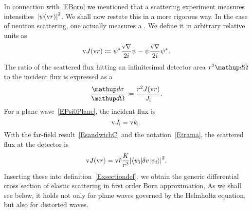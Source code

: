 In connection with \cref{EBorn} we mentioned
that a scattering experiment measures intensities~${|\psi(\text{v}{r})|}^2$.
We shall now restate this in a more rigorous way.
In the case of neutron scattering,
one actually measures a .
We define it in arbitrary relative units as
\begin{equation}\label{EdefJ}
  \text{v}{J}(\text{v}{r}) \coloneqq  \psi^*\frac{\text{v}{\nabla}}{2i}\psi - \psi\frac{\text{v}{\nabla}}{2i}\psi^*.
\end{equation}
%
%
The ratio of the scattered flux hitting an infinitesimal detector area
$r^2\d\Omega$ to the incident flux is expressed as a
%
%
\begin{equation}\label{Exsectiondef}
  \xElas
  \coloneqq  \frac{r^2 J(\r)}{J_\si}.
\end{equation}
%
%
For a plane wave~\cref{EPsi0Plane}, the incident flux is
%
%
\begin{equation}\label{EJi}
  \text{v}{J}_{\text{i}} = \text{v}{k}_{\text{i}}.
\end{equation}
With the far-field result~\cref{EsandwichC}
and the notation~\cref{Etrama},
the scattered flux at the detector is
\begin{equation}\label{EJr}
  \text{v}{J}(\text{v}{r})
  = \text{v}{\hat r}\frac{K}{r^2}
    {\left|\left\langle\psi_{\text{i}}|\delta v|\psi_{\text{f}}\right\rangle\right|}^2.
\end{equation}
Inserting these into definition~\cref{Exsectiondef},
we obtain the generic differential cross section
of elastic scattering in first order Born approximation,
%
%
%
%
As we shall see below,
it holds not only for plane waves governed
by the Helmholtz equation,
but also for distorted waves.
%

